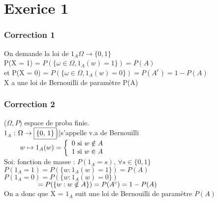 \documentclass{article}
\author{Frederic Becerril}
\newcommand\tab[1][1cm]{\hspace*{#1}}
\begin{document}
\part*{Exerice 1}

\section*{Correction 1}

On demande la loi de $1_A \Omega \rightarrow \{0, 1\}$\\
P(X = 1) = $P(\{\omega \in \Omega, 1_A(w) = 1\}) = P(A)$\\
et P(X = 0) = $P(\{\omega \in \Omega, 1_A(w) = 0\}) = P(A^c) = 1 - P(A)$\\
X a une loi de Bernouilli de paramètre P(A)

\section*{Correction 2}

($\Omega, P$) espace de proba finie.\\
$1_A$ : $\Omega \rightarrow \fbox{\{0, 1\}}$||s'appelle v.a de Bernouilli\\
$\tab[0.8cm] w \mapsto 1_A(w) = \left\{
    \begin{array}{ll}
        0 \mbox{ si } w \notin A\\
        1 \mbox{ si } w \in A\\
    \end{array}
\right.$\\
Soi: fonction de masse : $P(1_A = s)$, $\forall s \in \{0, 1\}$\\
$P(1_A = 1) = P(\{w: 1_A(w) = 1\}) = P(A)$\\
$P(1_A = 0) = P(\{w: 1_A(w) = 0\})$\\
$\tab[1.7cm] = P(\{w:w\notin A\}) = P(A^c) = 1 - P(A)$\\
On a donc que X = $1_A$ suit une loi de Bernouilli de paramètre $P(A)$
\end{document}
